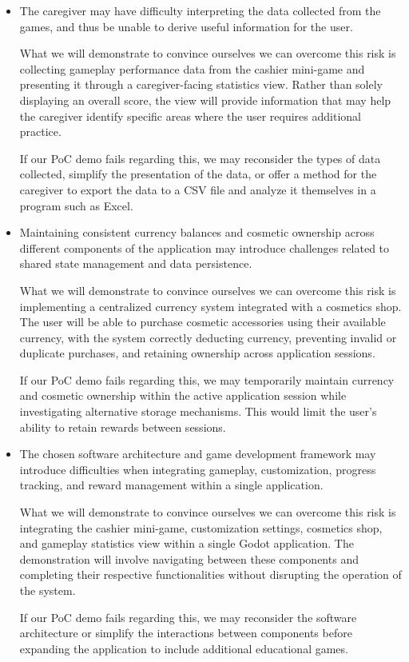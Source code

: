 \documentclass{article}
\begin{document}
\begin{itemize}
  If our PoC demo fails regarding this, we may implement a binary difficulty option distinguishing between whole-number and decimal-based calculations, reducing the granularity of difficulty customization.

  \item The caregiver may have difficulty interpreting the data collected from the games, and thus be unable to derive useful information for the user.

  What we will demonstrate to convince ourselves we can overcome this risk is collecting gameplay performance data from the cashier mini-game and presenting it through a caregiver-facing statistics view. Rather than solely displaying an overall score, the view will provide information that may help the caregiver identify specific areas where the user requires additional practice.

  If our PoC demo fails regarding this, we may reconsider the types of data collected, simplify the presentation of the data, or offer a method for the caregiver to export the data to a CSV file and analyze it themselves in a program such as Excel.

  \item Maintaining consistent currency balances and cosmetic ownership across different components of the application may introduce challenges related to shared state management and data persistence.

  What we will demonstrate to convince ourselves we can overcome this risk is implementing a centralized currency system integrated with a cosmetics shop. The user will be able to purchase cosmetic accessories using their available currency, with the system correctly deducting currency, preventing invalid or duplicate purchases, and retaining ownership across application sessions.

  If our PoC demo fails regarding this, we may temporarily maintain currency and cosmetic ownership within the active application session while investigating alternative storage mechanisms. This would limit the user's ability to retain rewards between sessions.

  \item The chosen software architecture and game development framework may introduce difficulties when integrating gameplay, customization, progress tracking, and reward management within a single application.

  What we will demonstrate to convince ourselves we can overcome this risk is integrating the cashier mini-game, customization settings, cosmetics shop, and gameplay statistics view within a single Godot application. The demonstration will involve navigating between these components and completing their respective functionalities without disrupting the operation of the system.

  If our PoC demo fails regarding this, we may reconsider the software architecture or simplify the interactions between components before expanding the application to include additional educational games.
\end{itemize}
\end{document}
